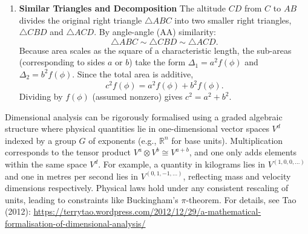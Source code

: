 {\begin{enumerate}
\begin{center}
\begin{tikzpicture}[scale=1]
    \end{tikzpicture}
    \end{center}
    \item \textbf{Similar Triangles and Decomposition}  
    \newline
    The altitude $CD$ from $C$ to $AB$ divides the original right triangle $\triangle ABC$ into two smaller right triangles, $\triangle CBD$ and $\triangle ACD$. By angle-angle (AA) similarity:
    \[
    \triangle ABC \sim \triangle CBD \sim \triangle ACD.
    \]
    Because area scales as the square of a characteristic length, the sub-areas (corresponding to sides $a$ or $b$) take the form $\Delta_1 = a^2 f(\phi)$ and $\Delta_2 = b^2 f(\phi)$.
    Since the total area is additive,  
    \[
    c^2 f(\phi) = a^2 f(\phi) + b^2 f(\phi).
    \]
    Dividing by $f(\phi)$ (assumed nonzero) gives
    $c^2 = a^2 + b^2$.
\end{enumerate}
\vspace{0.5em}
Dimensional analysis can be rigorously formalised using a graded algebraic structure where physical quantities lie in one-dimensional vector spaces $V^d$ indexed by a group $G$ of exponents (e.g., $\mathbb{R}^n$ for base units). Multiplication corresponds to the tensor product $V^a \otimes V^b \cong V^{a+b}$, and one only adds elements within the same space $V^d$. For example, a quantity in kilograms lies in $V^{(1,0,0,\ldots)}$ and one in metres per second lies in $V^{(0,1,-1,\ldots)}$, reflecting mass and velocity dimensions respectively. Physical laws hold under any consistent rescaling of units, leading to constraints like Buckingham's $\pi$-theorem.  
For details, see Tao (2012):  
\href{https://terrytao.wordpress.com/2012/12/29/a-mathematical-formalisation-of-dimensional-analysis/}{https://terrytao.wordpress.com/2012/12/29/a-mathematical-formalisation-of-dimensional-analysis/}
}
